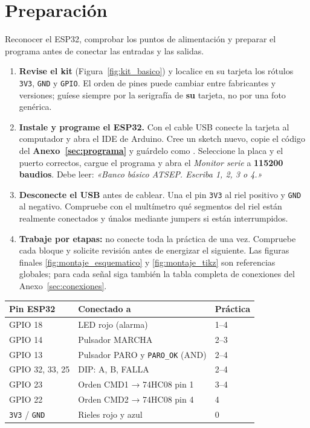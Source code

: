 \documentclass[11pt,a4paper]{article}
\newcommand{\sig}[1]{\texttt{#1}}
\begin{document}
\section{Preparación}

\begin{objetivo}
Reconocer el ESP32, comprobar los puntos de alimentación y preparar el programa antes de conectar las entradas y las salidas.
\end{objetivo}

\begin{enumerate}
 \item \textbf{Revise el kit} (Figura~\ref{fig:kit_basico}) y localice en su tarjeta los rótulos \sig{3V3}, \sig{GND} y \sig{GPIO}. El orden de pines puede cambiar entre fabricantes y versiones; guíese siempre por la serigrafía de \textbf{su} tarjeta, no por una foto genérica.
 \item \textbf{Instale y programe el ESP32.} Con el cable USB conecte la tarjeta al computador y abra el IDE de Arduino. Cree un sketch nuevo, copie el código del \textbf{Anexo~\ref{sec:programa}} y guárdelo como . Seleccione la placa y el puerto correctos, cargue el programa y abra el \emph{Monitor serie} a \textbf{115200 baudios}. Debe leer: \emph{«Banco básico ATSEP. Escriba 1, 2, 3 o 4.»}
 \item \textbf{Desconecte el USB} antes de cablear. Una el pin \sig{3V3} al riel positivo y \sig{GND} al negativo. Compruebe con el multímetro qué segmentos del riel están realmente conectados y únalos mediante jumpers si están interrumpidos.
 \item \textbf{Trabaje por etapas:} no conecte toda la práctica de una vez. Compruebe cada bloque y solicite revisión antes de energizar el siguiente. Las figuras finales \ref{fig:montaje_esquematico} y \ref{fig:montaje_tikz} son referencias globales; para cada señal siga también la tabla completa de conexiones del Anexo~\ref{sec:conexiones}.
\end{enumerate}

\begin{center}\small\renewcommand{\arraystretch}{1.2}
\begin{tabular}{@{}l l l@{}}
\toprule
\textbf{Pin ESP32} & \textbf{Conectado a} & \textbf{Práctica}\\
\midrule
GPIO 18 & LED rojo (alarma) & 1--4\\
GPIO 14 & Pulsador MARCHA & 2--3\\
GPIO 13 & Pulsador PARO y \sig{PARO\_OK} (AND) & 2--4\\
GPIO 32, 33, 25 & DIP: A, B, FALLA & 2--4\\
GPIO 23 & Orden CMD1 → 74HC08 pin 1 & 3--4\\
GPIO 22 & Orden CMD2 → 74HC08 pin 4 & 4\\
\sig{3V3} / \sig{GND} & Rieles rojo y azul & 0\\
\bottomrule
\end{tabular}
\end{center}
\end{document}
